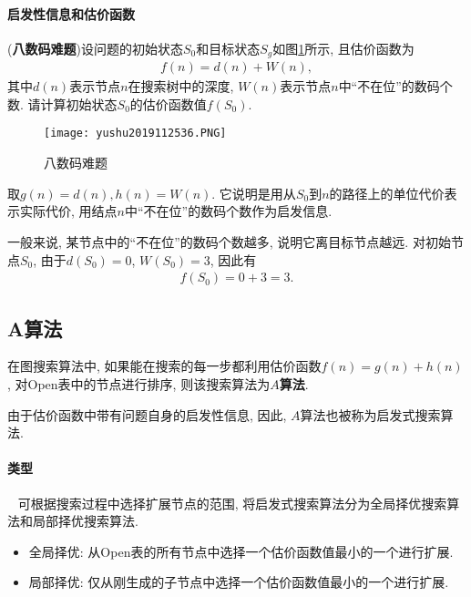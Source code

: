 \paragraph{启发性信息和估价函数}
\begin{example}\label{AI32C4exam08}
(\textbf{八数码难题})设问题的初始状态$S_0$和目标状态$S_g$如图\ref{AI32fig2019120134}所示, 且估价函数为
\begin{align}
  f(n)=d(n)+W(n),
\end{align}
其中$d(n)$表示节点$n$在搜索树中的深度, $W(n)$表示节点$n$中“不在位”的数码个数.
请计算初始状态$S_0$的估价函数值$f(S_0)$.
\end{example}
\begin{figure}[H]
\centering
\texttt{[image: yushu2019112536.PNG]}
\caption{八数码难题}
\label{AI32fig2019120134}
\end{figure}
\begin{result}
取$g(n)=d(n),h(n)=W(n)$. 它说明是用从$S_0$到$n$的路径上的单位代价表示实际代价, 用结点$n$中“不在位”的数码个数作为启发信息.

一般来说, 某节点中的“不在位”的数码个数越多, 说明它离目标节点越远.
对初始节点$S_0$, 由于$d(S_0)=0$, $W(S_0)=3$, 因此有
\begin{align}
  f(S_0)=0+3=3.
\end{align}
\end{result}
\subsection{A算法}
在图搜索算法中, 如果能在搜索的每一步都利用估价函数$f(n)=g(n)+h(n)$, 对Open表中的节点进行排序, 则该搜索算法为\textbf{$A$算法}.
\begin{remark}
  由于估价函数中带有问题自身的启发性信息, 因此, $A$算法也被称为启发式搜索算法.
\end{remark}
\paragraph{类型}~{}
可根据搜索过程中选择扩展节点的范围, 将启发式搜索算法分为全局择优搜索算法和局部择优搜索算法.
\begin{itemize}
	\item \textcolor[rgb]{0,0,1}{全局择优}:  从Open表的所有节点中选择一个估价函数值最小的一个进行扩展.
	\item \textcolor[rgb]{0,0,1}{局部择优}: 仅从刚生成的子节点中选择一个估价函数值最小的一个进行扩展.
\end{itemize}

